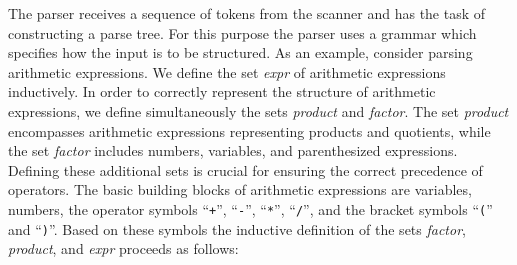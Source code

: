 The parser receives a sequence of tokens from the scanner and has the task of constructing a
parse tree.  For this purpose the parser uses a
grammar which specifies how the input is to be structured.  As an example, consider parsing arithmetic
expressions.  We define the set \textsl{expr} of arithmetic expressions inductively.  
In order to correctly represent the structure of arithmetic expressions, we define
simultaneously the sets \textsl{product} and \textsl{factor}.
The set \textsl{product} encompasses arithmetic expressions representing products and quotients, while the set
\textsl{factor} includes numbers, variables, and parenthesized expressions. Defining these additional sets is crucial for
ensuring the correct precedence of operators.  The basic building blocks of arithmetic expressions are
variables, numbers, the operator symbols
``\texttt{+}'', ``\texttt{-}'', ``\texttt{*}'', ``\texttt{/}'',
and the bracket symbols ``\texttt{(}'' and ``\texttt{)}''.  Based on these symbols
the inductive definition of the sets \textsl{factor}, \textsl{product}, and
\textsl{expr} proceeds as follows:

